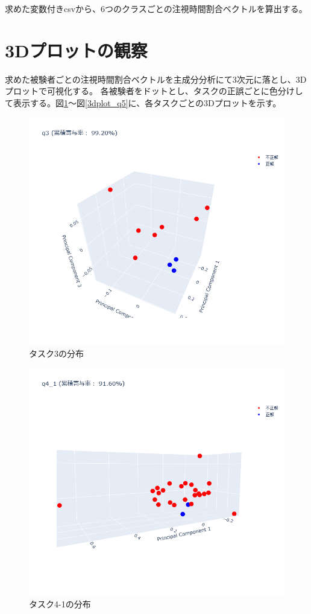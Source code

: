 \documentclass[paper=a4paper,fontsize=11pt]{jlreq}
\begin{document}
  求めた変数付きcsvから、6つのクラスごとの注視時間割合ベクトルを算出する。
  
  \section{3Dプロットの観察}
    求めた被験者ごとの注視時間割合ベクトルを主成分分析にて3次元に落とし、3Dプロットで可視化する。
    各被験者をドットとし、タスクの正誤ごとに色分けして表示する。図\ref{3dplot_q3}～図\ref{3dplot_q5}に、各タスクごとの3Dプロットを示す。
    \begin{figure}[htbp]
      \centering
      \includegraphics[width=0.8\linewidth]{3dplot_q3.png}
      \caption{タスク3の分布}
      \label{3dplot_q3}
    \end{figure}
    \FloatBarrier
    \begin{figure}[htbp]
      \centering
      \includegraphics[width=0.8\linewidth]{3dplot_q4_1.png}
      \caption{タスク4-1の分布}
      \label{3dplot_q4_1}
    \end{figure}
\end{document}
